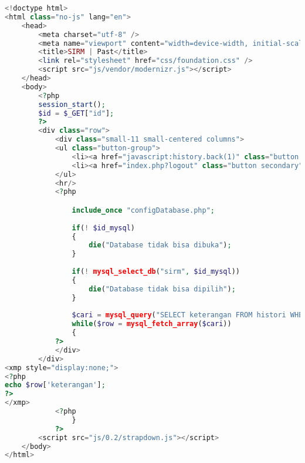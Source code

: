 \begin{lstlisting}[language=php,basicstyle=\tiny,caption=past.php]
<!doctype html>
<html class="no-js" lang="en">
	<head>
		<meta charset="utf-8" />
		<meta name="viewport" content="width=device-width, initial-scale=1.0" />
		<title>SIRM | Past</title>
		<link rel="stylesheet" href="css/foundation.css" />
		<script src="js/vendor/modernizr.js"></script>
	</head>
	<body>
		<?php
		session_start();
		$id = $_GET["id"];
		?>
		<div class="row">
			<div class="small-11 small-centered columns">
			<ul class="button-group">
				<li><a href="javascript:history.back(1)" class="button secondary">Kembali</a></li>
				<li><a href="index.php?logout" class="button secondary">Logout</a></li>
			</ul>
			<hr/>
			<?php

				include_once "configDatabase.php";
				
				if(! $id_mysql)
				{
					die("Database tidak bisa dibuka");
				}
					
				if(! mysql_select_db("sirm", $id_mysql))
				{
					die("Database tidak bisa dipilih");
				}
				
				$cari = mysql_query("SELECT keterangan FROM histori WHERE id_histori='$id'", $id_mysql);
				while($row = mysql_fetch_array($cari))
				{
			?>
			</div>
		</div>
<xmp style="display:none;">
<?php
echo $row['keterangan'];
?>
</xmp>
			<?php
				}
			?>
		<script src="js/0.2/strapdown.js"></script>
	</body>
</html>
\end{lstlisting}

